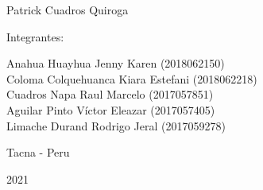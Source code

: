 \documentclass[12pt,letterpaper]{article}
\begin{document}
\begin{titlepage}
\begin{center}
\vspace*{0.1in}
\begin{large}
 Patrick Cuadros Quiroga\\
\end{large}

\vspace*{0.2in}
\vspace*{0.1in}
\begin{large}
Integrantes: \\
\begin{flushleft}
Anahua Huayhua Jenny Karen		\hfill	(2018062150) \\
Coloma Colquehuanca Kiara Estefani		\hfill	(2018062218) \\
Cuadros Napa Raul Marcelo         	\hfill	(2017057851) \\
Aguilar Pinto Víctor Eleazar			\hfill	(2017057405) \\
Limache Durand Rodrigo Jeral      	\hfill	(2017059278) \\
\end{flushleft}
\end{large}
\vspace*{0.8in}
Tacna - Peru\end{center}
\begin{center}
2021\end{center}
\end{titlepage}
\end{document}
